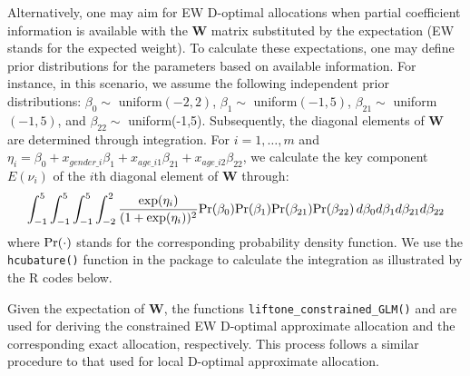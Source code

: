Alternatively, one may aim for EW D-optimal allocations when partial coefficient information is available with the ${\mathbf W}$ matrix substituted by the expectation (EW stands for the expected weight). To calculate these expectations, one may define prior distributions for the parameters based on available information. For instance, in this scenario, we assume the following independent prior distributions: $\beta_0\sim$ uniform$(-2,2)$, $\beta_1\sim$ uniform$(-1,5)$, $\beta_{21}\sim$ uniform$(-1,5)$, and $\beta_{22}\sim$ uniform(-1,5). Subsequently, the diagonal elements of ${\mathbf W}$ are determined through integration. For $i=1,\dots,m$ and $\eta_i = \beta_0 + x_{gender\_i}\beta_1+ x_{age\_i1}\beta_{21}+ x_{age\_i2}\beta_{22}$, we calculate the key component $E(\nu_i)$ of the $i$th diagonal element of ${\mathbf W}$ through:
\begin{equation*}
  \int_{-1}^{5} \int_{-1}^{5} \int_{-1}^{5} \int_{-2}^{2} \frac{\exp(\eta_i)}{(1+\exp(\eta_i))^2} {\rm Pr}(\beta_0){\rm Pr}(\beta_{1}){\rm Pr}(\beta_{21}){\rm Pr}(\beta_{22}) \, d\beta_0 d\beta_1 d\beta_{21} d\beta_{22}
\end{equation*}
where $\rm{Pr}(\cdot)$ stands for the corresponding probability density function.
We use the \texttt{hcubature()} function in the  package to calculate the integration as illustrated by the R codes below.

Given the expectation of ${\mathbf W}$, the functions \texttt{liftone\_constrained\_GLM()} and \texttt{} are used for deriving the constrained EW D-optimal approximate allocation and the corresponding exact allocation, respectively. This process follows a similar procedure to that used for local D-optimal approximate allocation.

